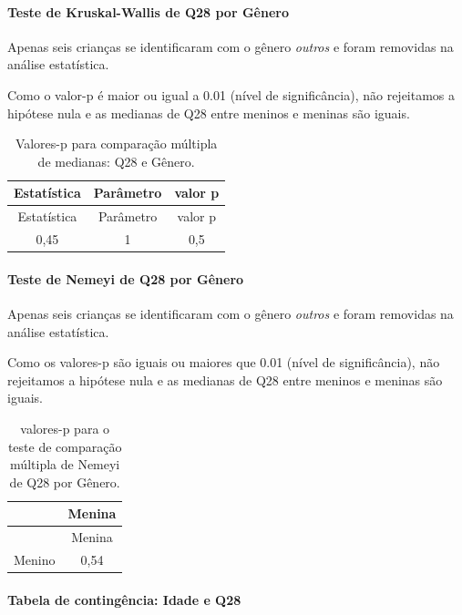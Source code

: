 \documentclass[]{article}
\let\oldparagraph\paragraph
\renewcommand{\paragraph}[1]{\oldparagraph{#1}\mbox{}}
\begin{document}
\hypertarget{teste-de-kruskal-wallis-de-q28-por-guxeanero}{%
\paragraph{Teste de Kruskal-Wallis de Q28 por Gênero}\label{teste-de-kruskal-wallis-de-q28-por-guxeanero}}

Apenas seis crianças se identificaram com o gênero \emph{outros} e foram removidas na análise estatística.

Como o valor-p é maior ou igual a 0.01 (nível de significância), não rejeitamos a hipótese nula e as medianas de Q28 entre meninos e meninas são iguais.

\begin{longtable}[]{@{}ccc@{}}
\caption{\label{tab:unnamed-chunk-856}Valores-p para comparação múltipla de medianas: Q28 e Gênero.}\tabularnewline
\toprule
Estatística & Parâmetro & valor p\tabularnewline
\midrule
\endfirsthead
\toprule
Estatística & Parâmetro & valor p\tabularnewline
\midrule
\endhead
0,45 & 1 & 0,5\tabularnewline
\bottomrule
\end{longtable}

\hypertarget{teste-de-nemeyi-de-q28-por-guxeanero}{%
\paragraph{Teste de Nemeyi de Q28 por Gênero}\label{teste-de-nemeyi-de-q28-por-guxeanero}}

Apenas seis crianças se identificaram com o gênero \emph{outros} e foram removidas na análise estatística.

Como os valores-p são iguais ou maiores que 0.01 (nível de significância), não rejeitamos a hipótese nula e as medianas de Q28 entre meninos e meninas são iguais.

\begin{longtable}[]{@{}lc@{}}
\caption{\label{tab:unnamed-chunk-858}valores-p para o teste de comparação múltipla de Nemeyi de Q28 por Gênero.}\tabularnewline
\toprule
& Menina\tabularnewline
\midrule
\endfirsthead
\toprule
& Menina\tabularnewline
\midrule
\endhead
Menino & 0,54\tabularnewline
\bottomrule
\end{longtable}

\cleardoublepage

\hypertarget{tabela-de-continguxeancia-idade-e-q28}{%
\paragraph{Tabela de contingência: Idade e Q28}\label{tabela-de-continguxeancia-idade-e-q28}}
\end{document}
